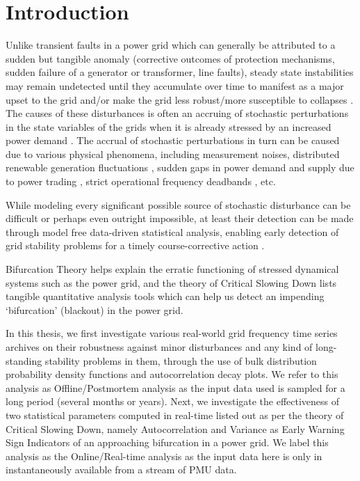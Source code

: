 \section[Introduction]{Introduction}
\label{sec:intro}

Unlike transient faults in a power grid which can generally be attributed to a sudden but tangible anomaly (corrective outcomes of protection mechanisms, sudden failure of a generator or transformer, line faults), steady state instabilities may remain undetected until they accumulate over time to manifest as a major upset to the grid \cite{entsoeReportGridCollapseContinentalEurope2021Jan} and/or make the grid less robust/more susceptible to collapses \cite{schafer01}. The causes of these disturbances is often an accruing of stochastic perturbations in the state variables of the grids when it is already stressed by an increased power demand \cite{rosehartBifurcationAnalysisOfVariousPowerSystemModels}.  The accrual of stochastic perturbations in turn can be caused due to various physical phenomena, including measurement noises, distributed renewable generation fluctuations \cite{adeen01}, sudden gaps in power demand and supply due to power trading \cite{schafer01}, strict operational frequency deadbands \cite{vorobev01, francesca01}, etc.
 
While modeling every significant possible source of stochastic disturbance can be difficult or perhaps even outright impossible, at least their detection can be made through model free data-driven statistical analysis, enabling early detection of grid stability problems for a timely course-corrective action \cite{schafer01, sanchez01, ghanvati01}.

Bifurcation Theory \cite{nathanKutzNotesOnBifurcationTheoryAndNormalForms, rosehartBifurcationAnalysisOfVariousPowerSystemModels, chenBifurcationsAndChaosInEngineering, mohlerDyanmicsAndControlPartOne} helps explain the erratic functioning of stressed dynamical systems such as the power grid, and the theory of Critical Slowing Down \cite{schefferEarlyWarningSignalsForCriticalTransitions} lists tangible quantitative analysis tools which can help us detect an impending `bifurcation' (blackout) in the power grid.

In this thesis, we first investigate various real-world grid frequency time series archives on their robustness against minor disturbances and any kind of long-standing stability problems in them, through the use of bulk distribution probability density functions and autocorrelation decay plots. We refer to this analysis as Offline/Postmortem analysis as the input data used is sampled for a long period (several months or years). Next, we investigate the effectiveness of two statistical parameters computed in real-time listed out as per the theory of Critical Slowing Down, namely Autocorrelation and Variance as Early Warning Sign Indicators of an approaching bifurcation in a power grid. We label this analysis as the Online/Real-time analysis as the input data here is only in instantaneously available from a stream of PMU data.
